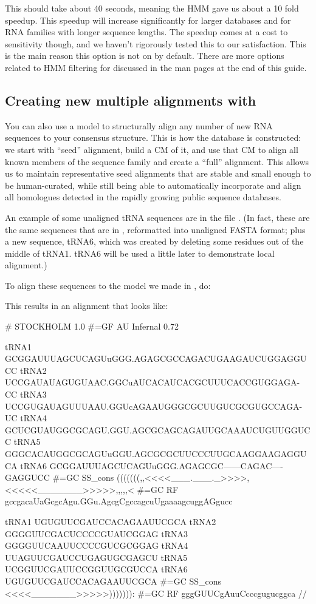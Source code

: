 
This should take about 40 seconds, meaning the HMM gave us about a 10
fold speedup. This speedup will increase significantly for larger
databases and for RNA families with longer sequence
lengths. The speedup comes at a cost to sensitivity though, and we haven't
rigorously tested this to our satisfaction. This is the main reason
this option is not on by default. There are more options related to
HMM filtering for  discussed in the man pages at the
end of this guide.

\subsection{Creating new multiple alignments with }

You can also use a model to structurally align any number of new RNA
sequences to your consensus structure. This is how the 
database is constructed: we start with ``seed'' alignment, build a CM
of it, and use that CM to align all known members of the sequence
family and create a ``full'' alignment. This allows us to maintain
representative seed alignments that are stable and small enough to be
human-curated, while still being able to automatically incorporate and
align all homologues detected in the rapidly growing public sequence
databases.

An example of some unaligned tRNA sequences are in the file
. (In fact, these are the same sequences that are in
, reformatted into unaligned FASTA format; plus a
new sequence, tRNA6, which was created by deleting some residues out
of the middle of tRNA1. tRNA6 will be used a little later to
demonstrate local alignment.)

To align these sequences to the model we made in , do:


This results in an alignment that looks like:

{\samepage
\begin{sreoutput}
# STOCKHOLM 1.0
#=GF AU    Infernal 0.72

tRNA1             GCGGAUUUAGCUCAGUuGGG.AGAGCGCCAGACUGAAGAUCUGGAGGUCC
tRNA2             UCCGAUAUAGUGUAAC.GGCuAUCACAUCACGCUUUCACCGUGGAGA-CC
tRNA3             UCCGUGAUAGUUUAAU.GGUcAGAAUGGGCGCUUGUCGCGUGCCAGA-UC
tRNA4             GCUCGUAUGGCGCAGU.GGU.AGCGCAGCAGAUUGCAAAUCUGUUGGUCC
tRNA5             GGGCACAUGGCGCAGUuGGU.AGCGCGCUUCCCUUGCAAGGAAGAGGUCA
tRNA6             GCGGAUUUAGCUCAGUuGGG.AGAGCGC------CAGAC----GAGGUCC
#=GC SS_cons      (((((((,,<<<<___.___._>>>>,<<<<<_______>>>>>,,,,,<
#=GC RF           gccgacaUaGcgcAgu.GGu.AgcgCgccagcuUgaaaagcuggAGgucc

tRNA1             UGUGUUCGAUCCACAGAAUUCGCA
tRNA2             GGGGUUCGACUCCCCGUAUCGGAG
tRNA3             GGGGUUCAAUUCCCCGUCGCGGAG
tRNA4             UUAGUUCGAUCCUGAGUGCGAGCU
tRNA5             UCGGUUCGAUUCCGGUUGCGUCCA
tRNA6             UGUGUUCGAUCCACAGAAUUCGCA
#=GC SS_cons      <<<<_______>>>>>))))))):
#=GC RF           gggGUUCgAuuCcccgugucggca
//
\end{sreoutput}
}

